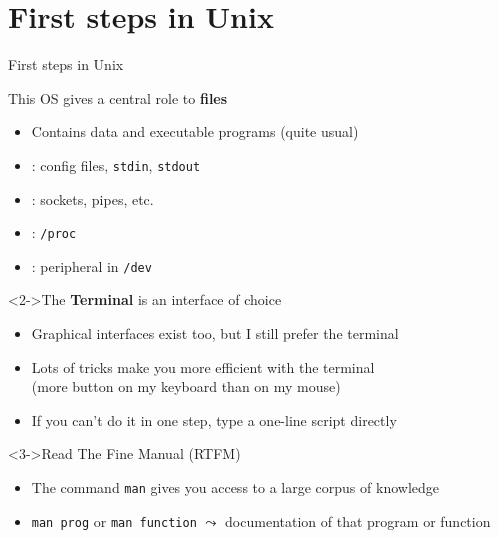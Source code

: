 \section{First steps in Unix}\sectionpage
\begin{frame}[squeeze]{First steps in Unix}
  \begin{block}{This OS gives a central role to \textbf{files}}
    \begin{itemize}
    \item Contains data and executable programs (quite usual)
      \medskip
    \item {} : config files,
      \texttt{stdin}, \texttt{stdout}
    \item {}: sockets, pipes, etc.
      \medskip
    \item {}: \texttt{/proc}
    \item {}: peripheral in \texttt{/dev}
    \end{itemize}
  \end{block}

  \begin{block}<2->{The \textbf{Terminal} is an interface of choice}
    \begin{itemize}
    \item Graphical interfaces exist too, but I still prefer the terminal
    \item Lots of tricks make you more efficient with the terminal\\
      (more button on my keyboard than on my mouse)
    \item If you can't do it in one step, type a one-line script directly
    \end{itemize}
  \end{block}

  \begin{block}<3->{Read The Fine Manual (RTFM)}
    \begin{itemize}
    \item The command \texttt{man} gives you access to a large corpus of
      knowledge
    \item \texttt{man prog} or \texttt{man function} $\leadsto$
      documentation of that program or function
    \end{itemize}
  \end{block}
\end{frame}

